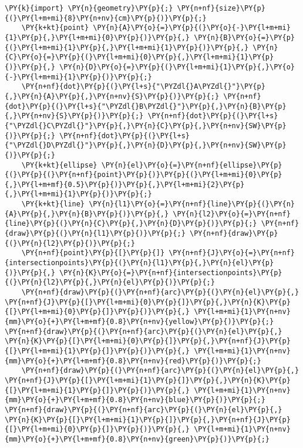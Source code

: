 \begin{Verbatim}[commandchars=\\\{\}]
    \PY{k}{import} \PY{n}{geometry}\PY{p}{;} \PY{n+nf}{size}\PY{p}{(}\PY{l+m+mi}{8}\PY{n+nv}{cm}\PY{p}{)}\PY{p}{;}
    \PY{k+kt}{point} \PY{n}{A}\PY{o}{=}\PY{p}{(}\PY{o}{-}\PY{l+m+mi}{1}\PY{p}{,}\PY{l+m+mi}{0}\PY{p}{)}\PY{p}{,} \PY{n}{B}\PY{o}{=}\PY{p}{(}\PY{l+m+mi}{1}\PY{p}{,}\PY{l+m+mi}{1}\PY{p}{)}\PY{p}{,} \PY{n}{C}\PY{o}{=}\PY{p}{(}\PY{l+m+mi}{0}\PY{p}{,}\PY{l+m+mi}{1}\PY{p}{)}\PY{p}{,} \PY{n}{D}\PY{o}{=}\PY{p}{(}\PY{l+m+mi}{1}\PY{p}{,}\PY{o}{-}\PY{l+m+mi}{1}\PY{p}{)}\PY{p}{;}
    \PY{n+nf}{dot}\PY{p}{(}\PY{l+s}{"\PYZdl{}A\PYZdl{}"}\PY{p}{,}\PY{n}{A}\PY{p}{,}\PY{n+nv}{S}\PY{p}{)}\PY{p}{;} \PY{n+nf}{dot}\PY{p}{(}\PY{l+s}{"\PYZdl{}B\PYZdl{}"}\PY{p}{,}\PY{n}{B}\PY{p}{,}\PY{n+nv}{S}\PY{p}{)}\PY{p}{;} \PY{n+nf}{dot}\PY{p}{(}\PY{l+s}{"\PYZdl{}C\PYZdl{}"}\PY{p}{,}\PY{n}{C}\PY{p}{,}\PY{n+nv}{SW}\PY{p}{)}\PY{p}{;} \PY{n+nf}{dot}\PY{p}{(}\PY{l+s}{"\PYZdl{}D\PYZdl{}"}\PY{p}{,}\PY{n}{D}\PY{p}{,}\PY{n+nv}{SW}\PY{p}{)}\PY{p}{;}
    \PY{k+kt}{ellipse} \PY{n}{el}\PY{o}{=}\PY{n+nf}{ellipse}\PY{p}{(}\PY{p}{(}\PY{n+nf}{point}\PY{p}{)}\PY{p}{(}\PY{l+m+mi}{0}\PY{p}{,}\PY{l+m+mf}{0.5}\PY{p}{)}\PY{p}{,}\PY{l+m+mi}{2}\PY{p}{,}\PY{l+m+mi}{1}\PY{p}{)}\PY{p}{;}
    \PY{k+kt}{line} \PY{n}{l1}\PY{o}{=}\PY{n+nf}{line}\PY{p}{(}\PY{n}{A}\PY{p}{,}\PY{n}{B}\PY{p}{)}\PY{p}{,} \PY{n}{l2}\PY{o}{=}\PY{n+nf}{line}\PY{p}{(}\PY{n}{C}\PY{p}{,}\PY{n}{D}\PY{p}{)}\PY{p}{;} \PY{n+nf}{draw}\PY{p}{(}\PY{n}{l1}\PY{p}{)}\PY{p}{;} \PY{n+nf}{draw}\PY{p}{(}\PY{n}{l2}\PY{p}{)}\PY{p}{;}
    \PY{n+nf}{point}\PY{p}{[}\PY{p}{]} \PY{n+nf}{J}\PY{o}{=}\PY{n+nf}{intersectionpoints}\PY{p}{(}\PY{n}{l1}\PY{p}{,}\PY{n}{el}\PY{p}{)}\PY{p}{,} \PY{n}{K}\PY{o}{=}\PY{n+nf}{intersectionpoints}\PY{p}{(}\PY{n}{l2}\PY{p}{,}\PY{n}{el}\PY{p}{)}\PY{p}{;}
    \PY{n+nf}{draw}\PY{p}{(}\PY{n+nf}{arc}\PY{p}{(}\PY{n}{el}\PY{p}{,} \PY{n+nf}{J}\PY{p}{[}\PY{l+m+mi}{0}\PY{p}{]}\PY{p}{,}\PY{n}{K}\PY{p}{[}\PY{l+m+mi}{0}\PY{p}{]}\PY{p}{)}\PY{p}{,} \PY{l+m+mi}{1}\PY{n+nv}{mm}\PY{o}{+}\PY{l+m+mf}{0.8}\PY{n+nv}{yellow}\PY{p}{)}\PY{p}{;} \PY{n+nf}{draw}\PY{p}{(}\PY{n+nf}{arc}\PY{p}{(}\PY{n}{el}\PY{p}{,} \PY{n}{K}\PY{p}{[}\PY{l+m+mi}{0}\PY{p}{]}\PY{p}{,}\PY{n+nf}{J}\PY{p}{[}\PY{l+m+mi}{1}\PY{p}{]}\PY{p}{)}\PY{p}{,} \PY{l+m+mi}{1}\PY{n+nv}{mm}\PY{o}{+}\PY{l+m+mf}{0.8}\PY{n+nv}{red}\PY{p}{)}\PY{p}{;}
    \PY{n+nf}{draw}\PY{p}{(}\PY{n+nf}{arc}\PY{p}{(}\PY{n}{el}\PY{p}{,} \PY{n+nf}{J}\PY{p}{[}\PY{l+m+mi}{1}\PY{p}{]}\PY{p}{,}\PY{n}{K}\PY{p}{[}\PY{l+m+mi}{1}\PY{p}{]}\PY{p}{)}\PY{p}{,} \PY{l+m+mi}{1}\PY{n+nv}{mm}\PY{o}{+}\PY{l+m+mf}{0.8}\PY{n+nv}{blue}\PY{p}{)}\PY{p}{;} \PY{n+nf}{draw}\PY{p}{(}\PY{n+nf}{arc}\PY{p}{(}\PY{n}{el}\PY{p}{,} \PY{n}{K}\PY{p}{[}\PY{l+m+mi}{1}\PY{p}{]}\PY{p}{,}\PY{n+nf}{J}\PY{p}{[}\PY{l+m+mi}{0}\PY{p}{]}\PY{p}{)}\PY{p}{,} \PY{l+m+mi}{1}\PY{n+nv}{mm}\PY{o}{+}\PY{l+m+mf}{0.8}\PY{n+nv}{green}\PY{p}{)}\PY{p}{;}

\end{Verbatim}
